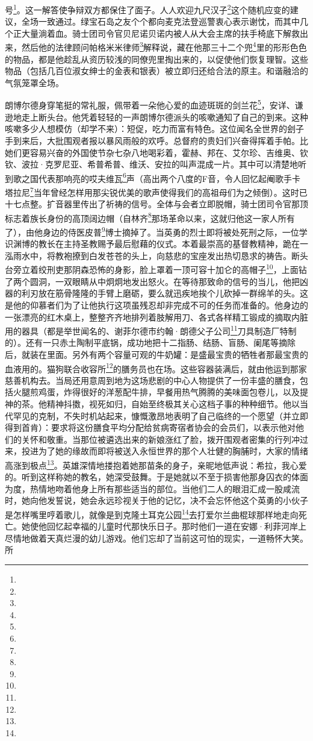 号\footnote{}。这一解答使争辩双方都保住了面子。人人欢迎九尺汉子\footnote{}这个随机应变的建议，全场一致通过。绿宝石岛之友个个都向麦克法登巡警衷心表示谢忱，而其中几个正大量淌着血。骑士团司令官贝尼诺贝诺内被人从大会主席的扶手椅底下解救出来，然后他的法律顾问帕格米米律师\footnote{}解释说，藏在他那三十二个兜\footnote{}里的形形色色的物品，都是他趁乱从资历较浅的同僚兜里掏出来的，以促使他们恢复理智。这些物品（包括几百位淑女绅士的金表和银表）被立即归还给合法的原主。和谐融洽的气氛笼罩全场。
\par 朗博尔德身穿笔挺的常礼服，佩带着一朵他心爱的血迹斑斑的剑兰花\footnote{}，安详、谦逊地走上断头台。他凭着轻轻的一声朗博尔德派头的咳嗽通知了自己的到来。这种咳嗽多少人想模仿（却学不来）：短促，吃力而富有特色。这位闻名全世界的刽子手到来后，大批围观者报以暴风雨般的欢呼。总督府的贵妇们兴奋得挥着手帕。比她们更容易兴奋的外国使节杂七杂八地喝彩着，霍赫、邦在、艾尔珍、吉维奥、钦钦、波拉·克罗尼亚、希普希普、维沃、安拉的叫声混成一片。其中可以清楚地听到歌之国代表那响亮的哎夫维瓦\footnote{}声（高出两个八度的F音，令人回忆起阉歌手卡塔拉尼\footnote{}当年曾经怎样用那尖锐优美的歌声使得我们的高祖母们为之倾倒）。这时已十七点整。扩音器里传出了祈祷的信号。全体与会者立即脱帽，骑士团司令官那顶标志着族长身份的高顶阔边帽（自林齐\footnote{}那场革命以来，这就归他这一家人所有了），由他身边的侍医皮普\footnote{}博士摘掉了。当英勇的烈士即将被处死刑之际，一位学识渊博的教长在主持圣教赐予最后慰藉的仪式。本着最崇高的基督教精神，跪在一泓雨水中，将教袍撩到白发苍苍的头上，向慈悲的宝座发出热切恳求的祷告。断头台旁立着绞刑吏那阴森恐怖的身影，脸上罩着一顶可容十加仑的高帽子\footnote{}，上面钻了两个圆洞，一双眼睛从中炯炯地发出怒火。在等待那致命的信号的当儿，他把凶器的利刃放在筋骨隆隆的手臂上磨砺，要么就迅疾地挨个儿砍掉一群绵羊的头。这是他的仰慕者们为了让他执行这项虽残忍却非完成不可的任务而准备的。他身边的一张漂亮的红木桌上，整整齐齐地排列着肢解用刀、各式各样精工锻成的摘取内脏用的器具（都是举世闻名的、谢菲尔德市约翰·朗德父子公司\footnote{}刀具制造厂特制的）。还有一只赤土陶制平底锅，成功地把十二指肠、结肠、盲肠、阑尾等摘除后，就装在里面。另外有两个容量可观的牛奶罐：是盛最宝贵的牺牲者那最宝贵的血液用的。猫狗联合收容所\footnote{}的膳务员也在场。这些容器装满后，就由他运到那家慈善机构去。当局还用意周到地为这场悲剧的中心人物提供了一份丰盛的膳食，包括火腿煎鸡蛋，炸得很好的洋葱配牛排，早餐用热气腾腾的美味面包卷儿，以及提神的茶。他精神抖擞，视死如归，自始至终极其关心这档子事的种种细节。他以当代罕见的克制，不失时机站起来，慷慨激昂地表明了自己临终的一个愿望（并立即得到首肯）：要求将这份膳食平均分配给贫病寄宿者协会的会员们，以表示他对他们的关怀和敬重。当那位被遴选出来的新娘涨红了脸，拨开围观者密集的行列冲过来，投进为了她的缘故而即将被送入永恒世界的那个人壮健的胸脯时，大家的情绪高涨到极点\footnote{}。英雄深情地搂抱着她那苗条的身子，亲昵地低声说：希拉，我心爱的。听到这样称她的教名，她深受鼓舞。于是她就以不至于损害他那身囚衣的体面为度，热情地吻着他身上所有那些适当的部位。当他们二人的眼泪汇成一股咸流时，她向他发誓说，她会永远珍视关于他的记忆，决不会忘怀他这个英勇的小伙子是怎样嘴里哼着歌儿，就像是到克隆土耳克公园\footnote{}去打爱尔兰曲棍球那样地走向死亡。她使他回忆起幸福的儿童时代那快乐日子。那时他们一道在安娜·利菲河岸上尽情地做着天真烂漫的幼儿游戏。他们忘却了当前这可怕的现实，一道畅怀大笑。所